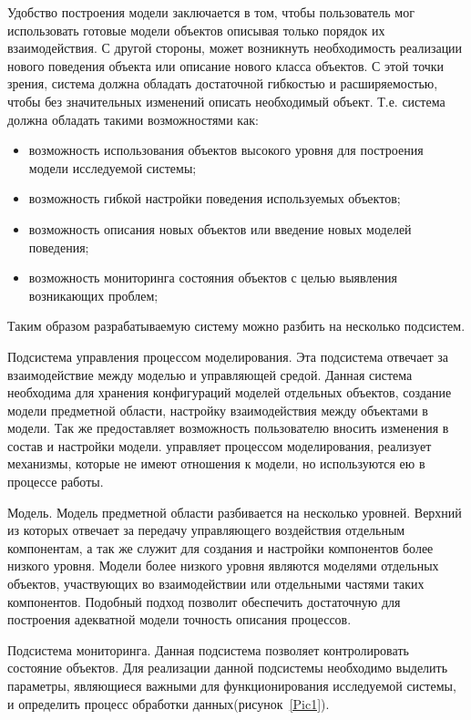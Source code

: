     Удобство построения модели заключается в том, чтобы пользователь мог использовать готовые модели объектов описывая только порядок их взаимодействия. С другой стороны, может возникнуть необходимость реализации нового поведения объекта или описание нового класса объектов. С этой точки зрения, система должна обладать достаточной гибкостью и расширяемостью, чтобы без значительных изменений описать необходимый объект. Т.е. система должна обладать такими возможностями как:

\begin{itemize}
    \item возможность использования объектов высокого уровня для построения модели исследуемой системы;
    \item возможность гибкой настройки поведения используемых объектов;
    \item возможность описания новых объектов или введение новых моделей поведения;
    \item возможность мониторинга состояния объектов с целью выявления возникающих проблем;
\end{itemize}

    Таким образом разрабатываемую систему можно разбить на несколько подсистем.

    Подсистема управления процессом моделирования. Эта подсистема отвечает за взаимодействие между моделью и управляющей средой. Данная система необходима для хранения конфигураций моделей отдельных объектов, создание модели предметной области, настройку взаимодействия между объектами в модели. Так же предоставляет возможность пользователю вносить изменения в состав и настройки модели. управляет процессом моделирования, реализует механизмы, которые не имеют отношения к модели, но используются ею в процессе работы.

    Модель. Модель предметной области разбивается на несколько уровней. Верхний из которых отвечает за передачу управляющего воздействия отдельным компонентам, а так же служит для создания и настройки компонентов более низкого уровня. Модели более низкого уровня являются моделями отдельных объектов, участвующих во взаимодействии или отдельными частями таких компонентов. Подобный подход позволит обеспечить достаточную для построения адекватной модели точность описания процессов.

    Подсистема мониторинга. Данная подсистема позволяет контролировать состояние объектов. Для реализации данной подсистемы необходимо выделить параметры, являющиеся важными для функционирования исследуемой системы, и определить процесс обработки данных(рисунок~\ref{Pic1}).

